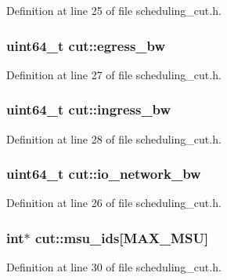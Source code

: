 Definition at line 25 of file scheduling\-\_\-cut.\-h.

\hypertarget{structcut_a8d676e103e1e29912c606f34ab34c5cf}{
\subsubsection[{egress\-\_\-bw}]{\setlength{\rightskip}{0pt plus 5cm}uint64\-\_\-t cut\-::egress\-\_\-bw}}\label{structcut_a8d676e103e1e29912c606f34ab34c5cf}


Definition at line 27 of file scheduling\-\_\-cut.\-h.

\hypertarget{structcut_a3fbcce011fd7ee1410f7fbf2fa27f293}{
\subsubsection[{ingress\-\_\-bw}]{\setlength{\rightskip}{0pt plus 5cm}uint64\-\_\-t cut\-::ingress\-\_\-bw}}\label{structcut_a3fbcce011fd7ee1410f7fbf2fa27f293}


Definition at line 28 of file scheduling\-\_\-cut.\-h.

\hypertarget{structcut_a3c0344ad7e8725763aebacac3632b0a6}{
\subsubsection[{io\-\_\-network\-\_\-bw}]{\setlength{\rightskip}{0pt plus 5cm}uint64\-\_\-t cut\-::io\-\_\-network\-\_\-bw}}\label{structcut_a3c0344ad7e8725763aebacac3632b0a6}


Definition at line 26 of file scheduling\-\_\-cut.\-h.

\hypertarget{structcut_abdfeb0b19bcc94fc210767f519777a3f}{
\subsubsection[{msu\-\_\-ids}]{\setlength{\rightskip}{0pt plus 5cm}int$\ast$ cut\-::msu\-\_\-ids\mbox{[}{\bf M\-A\-X\-\_\-\-M\-S\-U}\mbox{]}}}\label{structcut_abdfeb0b19bcc94fc210767f519777a3f}


Definition at line 30 of file scheduling\-\_\-cut.\-h.


